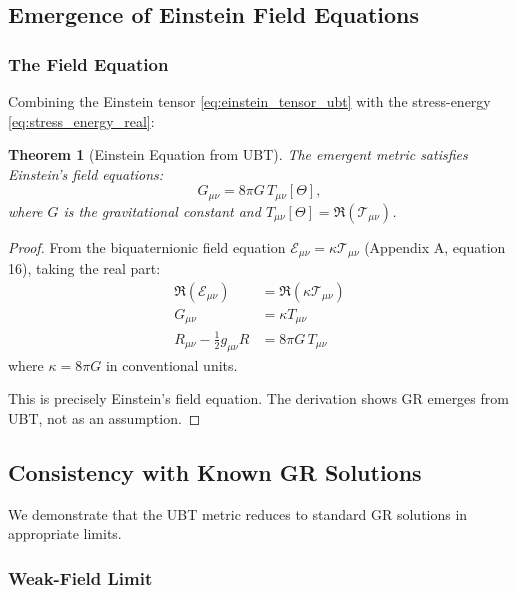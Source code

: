 \documentclass[12pt]{article}
\newtheorem{theorem}{Theorem}[section]
\theoremstyle{definition}
\theoremstyle{remark}
\begin{document}
\subsection{Emergence of Einstein Field Equations}

\subsubsection{The Field Equation}

Combining the Einstein tensor \eqref{eq:einstein_tensor_ubt} with the stress-energy \eqref{eq:stress_energy_real}:

\begin{theorem}[Einstein Equation from UBT]
The emergent metric satisfies Einstein's field equations:
\begin{equation}
G_{\mu\nu} = 8\pi G \, T_{\mu\nu}[\Theta],
\label{eq:einstein_field_ubt}
\end{equation}
where $G$ is the gravitational constant and $T_{\mu\nu}[\Theta] = \Re(\mathcal{T}_{\mu\nu})$.
\end{theorem}

\begin{proof}
From the biquaternionic field equation $\mathcal{E}_{\mu\nu} = \kappa\mathcal{T}_{\mu\nu}$ (Appendix A, equation 16), taking the real part:
\begin{align}
\Re(\mathcal{E}_{\mu\nu}) &= \Re(\kappa\mathcal{T}_{\mu\nu}) \\
G_{\mu\nu} &= \kappa T_{\mu\nu} \\
R_{\mu\nu} - \frac{1}{2}g_{\mu\nu}R &= 8\pi G \, T_{\mu\nu}
\end{align}
where $\kappa = 8\pi G$ in conventional units.

This is precisely Einstein's field equation. The derivation shows GR emerges from UBT, not as an assumption.
\end{proof}

\subsection{Consistency with Known GR Solutions}

We demonstrate that the UBT metric reduces to standard GR solutions in appropriate limits.

\subsubsection{Weak-Field Limit}
\end{document}
